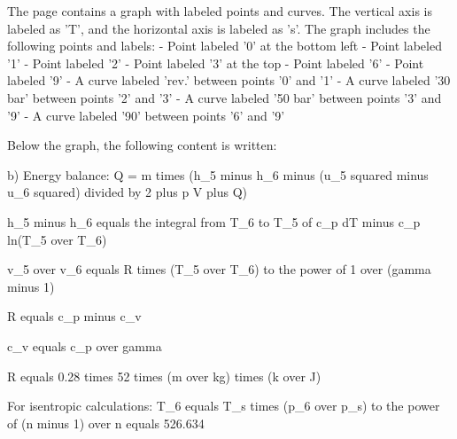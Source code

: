 The page contains a graph with labeled points and curves. The vertical axis is labeled as 'T', and the horizontal axis is labeled as 's'. The graph includes the following points and labels:
- Point labeled '0' at the bottom left
- Point labeled '1' 
- Point labeled '2'
- Point labeled '3' at the top
- Point labeled '6'
- Point labeled '9'
- A curve labeled 'rev.' between points '0' and '1'
- A curve labeled '30 bar' between points '2' and '3'
- A curve labeled '50 bar' between points '3' and '9'
- A curve labeled '90' between points '6' and '9'

Below the graph, the following content is written:

b) Energy balance:
Q = m times (h_5 minus h_6 minus (u_5 squared minus u_6 squared) divided by 2 plus p V plus Q)

h_5 minus h_6 equals the integral from T_6 to T_5 of c_p dT minus c_p ln(T_5 over T_6)

v_5 over v_6 equals R times (T_5 over T_6) to the power of 1 over (gamma minus 1)

R equals c_p minus c_v

c_v equals c_p over gamma

R equals 0.28 times 52 times (m over kg) times (k over J)

For isentropic calculations:
T_6 equals T_s times (p_6 over p_s) to the power of (n minus 1) over n equals 526.634
